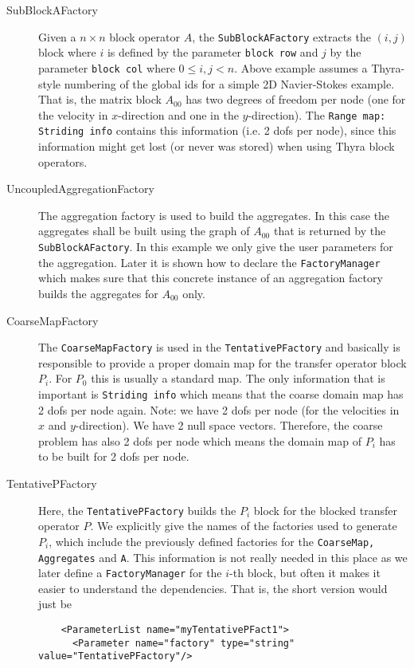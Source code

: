\documentclass[10pt,fleqn]{book}
\begin{document}
\begin{description}
\item[SubBlockAFactory] Given a $n\times n$ block operator $A$, the \texttt{SubBlockAFactory} extracts the $(i,j)$ block where $i$ is defined by the parameter \texttt{block row} and $j$ by the parameter \texttt{block col} where $0\leq i,j < n$. Above example assumes a Thyra-style numbering of the global ids for a simple 2D Navier-Stokes example. That is, the matrix block $A_{00}$ has two degrees of freedom per node (one for the velocity in $x$-direction and one in the $y$-direction). The \texttt{Range map: Striding info} contains this information (i.e. 2 dofs per node), since this information might get lost (or never was stored) when using Thyra block operators.
\item[UncoupledAggregationFactory] The aggregation factory is used to build the aggregates. In this case the aggregates shall be built using the graph of $A_{00}$ that is returned by the \texttt{SubBlockAFactory}. In this example we only give the user parameters for the aggregation. Later it is shown how to declare the \texttt{FactoryManager} which makes sure that this concrete instance of an aggregation factory builds the aggregates for $A_{00}$ only.
\item[CoarseMapFactory] The \texttt{CoarseMapFactory} is used in the \texttt{TentativePFactory} and basically is responsible to provide a proper domain map for the transfer operator block $P_i$. For $P_0$ this is usually a standard map. The only information that is important is \texttt{Striding info} which means that the coarse domain map has 2 dofs per node again. Note: we have 2 dofs per node (for the velocities in $x$ and $y$-direction). We have 2 null space vectors. Therefore, the coarse problem has also 2 dofs per node which means the domain map of $P_i$ has to be built for 2 dofs per node.
\item[TentativePFactory] Here, the \texttt{TentativePFactory} builds the $P_i$ block for the blocked transfer operator $P$. We explicitly give the names of the factories used to generate $P_i$, which include the previously defined factories for the \texttt{CoarseMap, Aggregates} and \texttt{A}. This information is not really needed in this place as we later define a \texttt{FactoryManager} for the $i$-th block, but often it makes it easier to understand the dependencies. That is, the short version would just be
\begin{lstlisting}
    <ParameterList name="myTentativePFact1">
      <Parameter name="factory" type="string" value="TentativePFactory"/>

\end{lstlisting}
\end{description}
\end{document}
